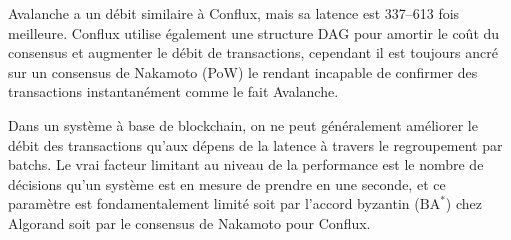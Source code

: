 Avalanche a un débit similaire à Conflux, mais sa latence est 337--613 fois meilleure. Conflux utilise également une
structure DAG pour amortir le coût du consensus et augmenter le débit de transactions, cependant il est toujours ancré
sur un consensus de Nakamoto (PoW) le rendant incapable de confirmer des transactions instantanément comme le fait
Avalanche.

Dans un système à base de blockchain, on ne peut généralement améliorer le débit des transactions qu'aux dépens de la
latence à travers le regroupement par batchs. Le vrai facteur limitant au niveau de la performance est le nombre de
décisions qu'un système est en mesure de prendre en une seconde, et ce paramètre est fondamentalement limité soit par
l'accord byzantin ($\mathrm{BA}^{*}$) chez Algorand soit par le consensus de Nakamoto pour Conflux.

